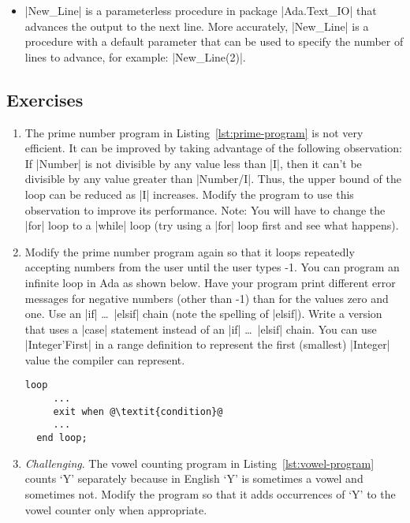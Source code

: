 \begin{itemize}
\item |New_Line| is a parameterless procedure in package |Ada.Text_IO| that advances the output
  to the next line. More accurately, |New_Line| is a procedure with a default parameter that can
  be used to specify the number of lines to advance, for example: |New_Line(2)|.
\end{itemize}

\subsection*{Exercises}

\begin{enumerate}
\item The prime number program in Listing~\ref{lst:prime-program} is not very efficient. It can
  be improved by taking advantage of the following observation: If |Number| is not divisible by
  any value less than |I|, then it can't be divisible by any value greater than |Number/I|. Thus,
  the upper bound of the loop can be reduced as |I| increases. Modify the program to use this
  observation to improve its performance. Note: You will have to change the |for| loop to a
  |while| loop (try using a |for| loop first and see what happens).

\item Modify the prime number program again so that it loops repeatedly accepting numbers from
  the user until the user types -1. You can program an infinite loop in Ada as shown below. Have
  your program print different error messages for negative numbers (other than -1) than for the
  values zero and one. Use an |if| \ldots\ |elsif| chain (note the spelling of |elsif|). Write a
  version that uses a |case| statement instead of an |if| \ldots\ |elsif| chain. You can use
  |Integer'First| in a range definition to represent the first (smallest) |Integer| value the
  compiler can represent.

  \begin{lstlisting}[escapechar=\@]
  loop
     ...
     exit when @\textit{condition}@
     ...
  end loop;
  \end{lstlisting}

\item \textit{Challenging}. The vowel counting program in Listing~\ref{lst:vowel-program} counts
  `Y' separately because in English `Y' is sometimes a vowel and sometimes not. Modify the
  program so that it adds occurrences of `Y' to the vowel counter only when appropriate.
\end{enumerate}

